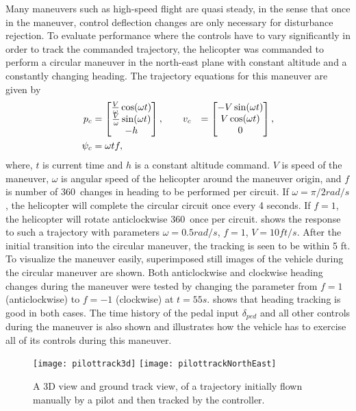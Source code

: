 Many maneuvers such as high-speed flight are quasi steady, in the
sense that once in the maneuver, control deflection changes are only
necessary for disturbance rejection. To evaluate performance where
the controls have to vary significantly in order to track the
commanded trajectory, the helicopter was commanded to perform a
circular maneuver in the north-east plane with constant altitude and
a constantly changing heading. The trajectory equations for this
maneuver are given by
\begin{alignat*}{2}
p_c &=
\begin{bmatrix}
\frac{V}{\omega}\cos(\omega t) \\
\frac{V}{\omega}\sin(\omega t) \\
-h
\end{bmatrix},
\qquad v_c &=
\begin{bmatrix}
-V\sin(\omega t) \\
V\cos(\omega t) \\
0
\end{bmatrix}, \nonumber \\
\psi_c &= \omega t f,
\end{alignat*}
where, $t$ is current time and $h$ is a constant altitude command.
$V$ is speed of the maneuver, $\omega$ is angular speed of the
helicopter around the maneuver origin, and $f$ is number of
360\textdegree\ changes in heading to be performed per circuit. If
$\omega=\pi/2 rad/s$, the helicopter will complete the circular
circuit once every 4 seconds. If $f = 1$, the helicopter will rotate
anticlockwise 360\textdegree\ once per circuit. 
shows the response to such a trajectory with parameters $\omega =
0.5 rad/s$, $f = 1$, $V = 10 ft/s$. After the initial transition
into the circular maneuver, the tracking is seen to be within 5 ft.
To visualize the maneuver easily, superimposed still images of the
vehicle during the circular maneuver are shown. Both anticlockwise
and clockwise heading changes during the maneuver were tested by
changing the parameter from $f=1$ (anticlockwise) to $f = -1$
(clockwise) at $t = 55s$.  shows that heading
tracking is good in both cases. The time history of the pedal input
$\delta_{ped}$ and all other controls during the maneuver is also
shown and illustrates how the vehicle has to exercise all of its
controls during this maneuver.

\begin{figure}
  \begin{center}
  \texttt{[image: pilottrack3d]}
  \texttt{[image: pilottrackNorthEast]}
  \caption{A 3D view and ground track view, of a trajectory initially flown manually by a pilot and then tracked by the controller.}
  \label{f:pilottrack3d}
  \end{center}
\end{figure}


